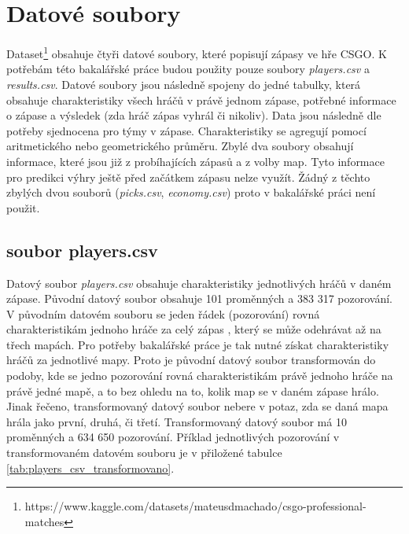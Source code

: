 \section{Datové soubory}
Dataset\footnote{https://www.kaggle.com/datasets/mateusdmachado/csgo-professional-matches} obsahuje čtyři 
{\color{red}
datové soubory,
}
které popisují zápasy ve hře
\ac{CSGO}. K potřebám této bakalářské práce budou použity pouze soubory \textit{players.csv} a \textit{results.csv}. Datové soubory jsou následně spojeny do jedné tabulky,
která obsahuje charakteristiky všech hráčů v právě jednom zápase, potřebné informace o zápase a výsledek (zda hráč zápas vyhrál či nikoliv). Data jsou následně dle potřeby
sjednocena pro týmy v zápase. Charakteristiky se agregují pomocí aritmetického nebo geometrického průměru. Zbylé dva soubory obsahují
informace, které jsou již z probíhajících zápasů a z volby map. Tyto informace pro predikci výhry ještě před začátkem zápasu nelze využít. Žádný z těchto
zbylých dvou souborů (\textit{picks.csv}, \textit{economy.csv}) proto v bakalářské práci není použit.

\subsection{soubor players.csv}
{\color{red}
Datový soubor
}
\textit{players.csv} obsahuje 
{\color{red}
charakteristiky
}
jednotlivých hráčů v daném zápase. Původní datový soubor obsahuje 101 proměnných a 383 317 pozorování.
V původním datovém souboru se jeden řádek (pozorování) rovná charakteristikám jednoho hráče za celý zápas
{\color{red}
, který se může odehrávat až na třech mapách.
}
Pro potřeby bakalářské práce je tak nutné získat charakteristiky hráčů
za jednotlivé mapy. Proto je původní datový soubor transformován do podoby, kde se jedno pozorování rovná charakteristikám
právě jednoho hráče na právě jedné mapě, a to bez ohledu na to, kolik map se v daném zápase hrálo. Jinak řečeno, transformovaný datový soubor nebere v potaz, zda
se daná mapa hrála jako první, druhá, či třetí.
Transformovaný datový soubor má 10 proměnných a 634 650 pozorování. Příklad jednotlivých pozorování v transformovaném
datovém souboru je v přiložené tabulce \ref{tab:players_csv_transformovano}.


